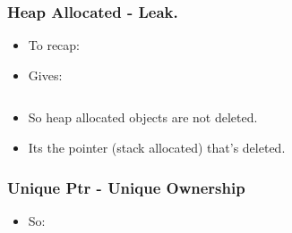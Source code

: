 \subsubsection{Heap Allocated - Leak.}\label{heap-allocated---leak.}

\begin{itemize}
\itemsep1pt\parskip0pt
\item
  To recap:
\end{itemize}

\begin{Shaded}
\begin{Highlighting}[]
 
   \NormalTok{,}\NormalTok{);}
\NormalTok{\}}

\end{Highlighting}
\end{Shaded}

\begin{itemize}
\itemsep1pt\parskip0pt
\item
  Gives:
\end{itemize}

\begin{verbatim}
\end{verbatim}

\begin{itemize}
\itemsep1pt\parskip0pt
\item
  So heap allocated objects are not deleted.
\item
  Its the pointer (stack allocated) that's deleted.
\end{itemize}

\subsubsection{Unique Ptr - Unique
Ownership}\label{unique-ptr---unique-ownership}

\begin{itemize}
\itemsep1pt\parskip0pt
\item
  So:
\end{itemize}

\begin{Shaded}
\begin{Highlighting}[]
 
   \NormalTok{,}\NormalTok{));}
\NormalTok{\}}

\end{Highlighting}
\end{Shaded}

